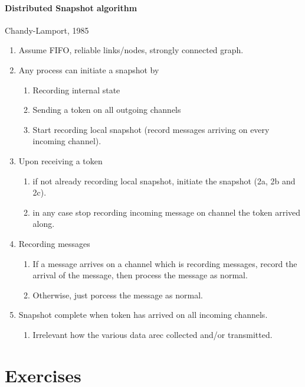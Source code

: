 \documentclass[11pt]{article}
\begin{document}
\paragraph{Distributed Snapshot algorithm} %
\label{par:distributed_snapshot_algorithm}
Chandy-Lamport, 1985
\begin{enumerate}
	\item Assume FIFO, reliable links/nodes, strongly connected graph.
	\item Any process can initiate a snapshot by
	\begin{enumerate}
		\item Recording internal state
		\item Sending a token on all outgoing channels
		\item Start recording local snapshot (record messages arriving on every incoming channel).
	\end{enumerate}
	\item Upon receiving a token
	\begin{enumerate}
		\item if not already recording local snapshot, initiate the snapshot (2a, 2b and 2c).
		\item in any case stop recording incoming message on channel the token arrived along. 
	\end{enumerate}
	\item Recording messages
	\begin{enumerate}
		\item If a message arrives on a channel which is recording messages, record the arrival of the message, then process the message as normal.
		\item Otherwise, just porcess the message as normal.
	\end{enumerate}
	\item Snapshot complete when token has arrived on all incoming channels.
	\begin{enumerate}
		\item Irrelevant how the various data arec collected and/or transmitted.
	\end{enumerate}
\end{enumerate}

\section{Exercises} %
\label{sec:exercises}
\end{document}
